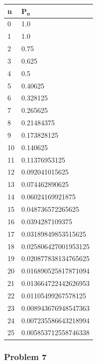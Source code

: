 \documentclass[11pt]{extarticle}
\begin{document}
\begin{enumerate}[(a)]
\begin{table}[ht!]
\centering
\scriptsize
\begin{tabular}{ll}
\toprule
\textbf{n} & $\mathbf{P_n}$ \\
\midrule
0 & 1.0 \\
1 & 1.0 \\
2 & 0.75 \\
3 & 0.625 \\
4 & 0.5 \\
5 & 0.40625 \\
6 & 0.328125 \\
7 & 0.265625 \\
8 & 0.21484375 \\
9 & 0.173828125 \\
10 & 0.140625 \\
11 & 0.11376953125 \\
12 & 0.092041015625 \\
13 & 0.074462890625 \\
14 & 0.06024169921875 \\
15 & 0.048736572265625 \\
16 & 0.0394287109375 \\
17 & 0.03189849853515625 \\
18 & 0.025806427001953125 \\
19 & 0.020877838134765625 \\
20 & 0.016890525817871094 \\
21 & 0.013664722442626953 \\
22 & 0.01105499267578125 \\
23 & 0.008943676948547363 \\
24 & 0.007235586643218994 \\
25 & 0.005853712558746338 \\
\toprule
\end{tabular}
\normalsize
\end{table}
\end{enumerate}



\subsubsection*{Problem 7}
\end{document}
